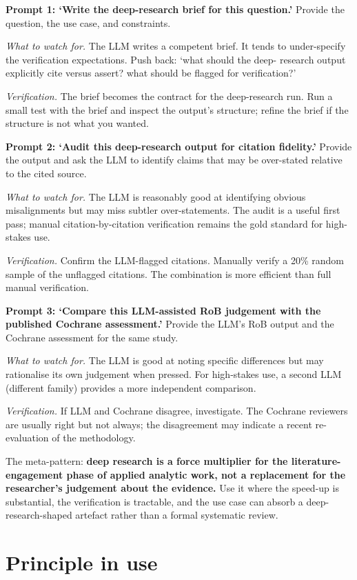 \documentclass[
  letterpaper,
  11pt]{scrbook}
\begin{document}
\textbf{Prompt 1: `Write the deep-research brief for this question.'}
Provide the question, the use case, and constraints.

\emph{What to watch for.} The LLM writes a competent brief. It tends to
under-specify the verification expectations. Push back: `what should the
deep- research output explicitly cite versus assert? what should be
flagged for verification?'

\emph{Verification.} The brief becomes the contract for the
deep-research run. Run a small test with the brief and inspect the
output's structure; refine the brief if the structure is not what you
wanted.

\textbf{Prompt 2: `Audit this deep-research output for citation
fidelity.'} Provide the output and ask the LLM to identify claims that
may be over-stated relative to the cited source.

\emph{What to watch for.} The LLM is reasonably good at identifying
obvious misalignments but may miss subtler over-statements. The audit is
a useful first pass; manual citation-by-citation verification remains
the gold standard for high-stakes use.

\emph{Verification.} Confirm the LLM-flagged citations. Manually verify
a 20\% random sample of the unflagged citations. The combination is more
efficient than full manual verification.

\textbf{Prompt 3: `Compare this LLM-assisted RoB judgement with the
published Cochrane assessment.'} Provide the LLM's RoB output and the
Cochrane assessment for the same study.

\emph{What to watch for.} The LLM is good at noting specific differences
but may rationalise its own judgement when pressed. For high-stakes use,
a second LLM (different family) provides a more independent comparison.

\emph{Verification.} If LLM and Cochrane disagree, investigate. The
Cochrane reviewers are usually right but not always; the disagreement
may indicate a recent re-evaluation of the methodology.

The meta-pattern: \textbf{deep research is a force multiplier for the
literature-engagement phase of applied analytic work, not a replacement
for the researcher's judgement about the evidence.} Use it where the
speed-up is substantial, the verification is tractable, and the use case
can absorb a deep- research-shaped artefact rather than a formal
systematic review.

\section{Principle in use}\label{principle-in-use-8}
\end{document}
